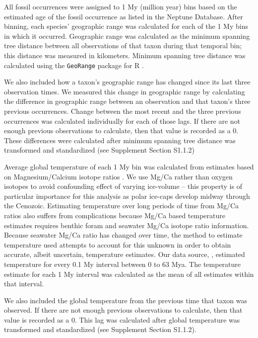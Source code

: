 \documentclass[12pt,letterpaper]{article}
\begin{document}
\begin{refsection}
All fossil occurrences were assigned to 1 My (million year) bins based on the estimated age of the fossil occurrence as listed in the Neptune Database. After binning, each species' geographic range was calculated for each of the 1 My bins in which it occurred. Geographic range was calculated as the minimum spanning tree distance between all observations of that taxon during that temporal bin; this distance was measured in kilometers. Minimum spanning tree distance was calculated using the \texttt{GeoRange} package for R \citep{GeoRange}. 

We also included how a taxon's geographic range has changed since its last three observation times. We measured this change in geographic range by calculating the difference in geographic range between an observation and that taxon's three previous occurrences. Change between the most recent and the three previous occurrences was calculated individually for each of those lags. If there are not enough previous observations to calculate, then that value is recorded as a 0. These differences were calculated after minimum spanning tree distance was transformed and standardized (see Supplement Section S1.1.2)

Average global temperature of each 1 My bin was calculated from estimates based on Magnesium/Calcium isotope ratios \citet{Cramer2011}. We use Mg/Ca rather than oxygen isotopes to avoid confounding effect of varying ice-volume -- this property is of particular importance for this analysis as polar ice-caps develop midway through the Cenozoic. Estimating temperature over long periods of time from Mg/Ca ratios also suffers from complications because Mg/Ca based temperature estimates requires benthic foram and seawater Mg/Ca isotope ratio information. Because seawater Mg/Ca ratio has changed over time, the method to estimate temperature used \citet{Cramer2011} attempts to account for this unknown in order to obtain accurate, albeit uncertain, temperature estimates. Our data source, \citet{Cramer2011}, estimated temperature for every 0.1 My interval between 0 to 63 Mya. The temperature estimate for each 1 My interval was calculated as the mean of all estimates within that interval. 

We also included the global temperature from the previous time that taxon was observed. If there are not enough previous observations to calculate, then that value is recorded as a 0. This lag was calculated after global temperature was transformed and standardized (see Supplement Section S1.1.2).


\end{refsection}
\end{document}
